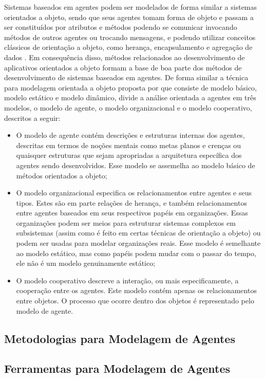 Sistemas baseados em agentes podem ser modelados de forma similar a sistemas orientados a objeto, sendo que seus agentes tomam forma de objeto e passam a ser constituídos por atributos e métodos podendo se comunicar invocando métodos de outros agentes ou trocando mensagens, e podendo utilizar conceitos clássicos de orientação a objeto, como herança, encapsulamento e agregação de dados \cite{intelligent}. Em consequência disso, métodos relacionados ao desenvolvimento de aplicativos orientados a objeto formam a base de boa parte dos métodos de desenvolvimento de sistemas baseados em agentes. De forma similar a técnica para modelagem orientada a objeto proposta por  que consiste de modelo básico, modelo estático e modelo dinâmico,  divide a análise orientada a agentes em três modelos, o modelo de agente, o modelo organizacional e o modelo cooperativo, descritos a seguir:

\begin{itemize}
  \item O modelo de agente contém descrições e estruturas internas dos agentes, descritas em termos de noções mentais como metas planos e crenças ou quaisquer estruturas que sejam apropriadas a arquitetura específica dos agentes sendo desenvolvidos. Esse modelo se assemelha ao modelo básico de métodos orientados a objeto;
  \item O modelo organizacional especifica os relacionamentos entre agentes e seus tipos. Estes são em parte relações de herança, e também relacionamentos entre agentes baseados em seus respectivos papéis em organizações. Essas organizações podem ser meios para estruturar sistemas complexos em subsistemas (assim como é feito em certas técnicas de orientação a objeto) ou podem ser usadas para modelar organizações reais. Esse modelo é semelhante ao modelo estático, mas como papéis podem mudar com o passar do tempo, ele não é um modelo genuinamente estático;
  \item O modelo cooperativo descreve a interação, ou mais especificamente, a cooperação entre os agentes. Este modelo contém apenas os  relacionamentos entre objetos. O processo que ocorre dentro dos objetos é representado pelo modelo de agente.
\end{itemize}


\subsection{Metodologias para Modelagem de Agentes}


\subsection{Ferramentas para Modelagem de Agentes}

